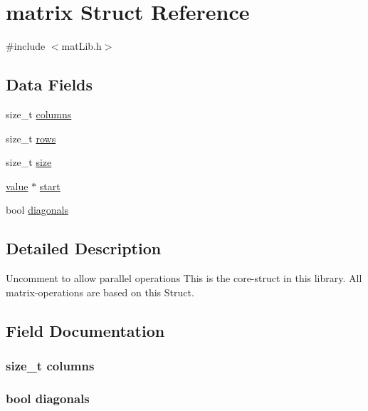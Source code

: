 \hypertarget{structmatrix}{}\section{matrix Struct Reference}
\label{structmatrix}


{\ttfamily \#include $<$mat\+Lib.\+h$>$}

\subsection*{Data Fields}
\begin{DoxyCompactItemize}
\item 
size\+\_\+t \hyperlink{structmatrix_a8f286185a216a03cae5eb89c39f19349}{columns}
\item 
size\+\_\+t \hyperlink{structmatrix_ad161320eba27a8b966baac47bee35c46}{rows}
\item 
size\+\_\+t \hyperlink{structmatrix_a854352f53b148adc24983a58a1866d66}{size}
\item 
\hyperlink{mat_lib_8h_a9068fffa81949df24c5a7a53ab72bb9b}{value} $\ast$ \hyperlink{structmatrix_a34f549255e7222691d5c0d1160ea26f1}{start}
\item 
bool \hyperlink{structmatrix_a364ca1611327dab86c8641beffd90b17}{diagonals}
\end{DoxyCompactItemize}


\subsection{Detailed Description}
Uncomment to allow parallel operations This is the core-\/struct in this library. All matrix-\/operations are based on this Struct. 

\subsection{Field Documentation}
\hypertarget{structmatrix_a8f286185a216a03cae5eb89c39f19349}{}
\subsubsection[{columns}]{\setlength{\rightskip}{0pt plus 5cm}size\+\_\+t columns}\label{structmatrix_a8f286185a216a03cae5eb89c39f19349}
\hypertarget{structmatrix_a364ca1611327dab86c8641beffd90b17}{}
\subsubsection[{diagonals}]{\setlength{\rightskip}{0pt plus 5cm}bool diagonals}\label{structmatrix_a364ca1611327dab86c8641beffd90b17}
\hypertarget{structmatrix_ad161320eba27a8b966baac47bee35c46}{}
